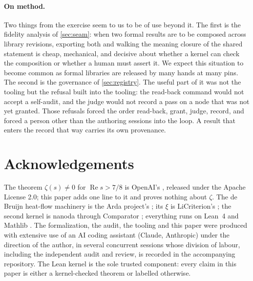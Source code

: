 \documentclass[11pt]{article}
\theoremstyle{definition}
\newcommand{\re}{\operatorname{Re}}
\begin{document}
\paragraph{On method.} Two things from the exercise seem to us to be of use beyond it. The first is the fidelity analysis of \cref{sec:seam}: when two formal results are to be composed across library revisions, exporting both and walking the meaning closure of the shared statement is cheap, mechanical, and decisive about whether a kernel can check the composition or whether a human must assert it. We expect this situation to become common as formal libraries are released by many hands at many pins. The second is the governance of \cref{sec:registry}. The useful part of it was not the tooling but the refusal built into the tooling: the read-back command would not accept a self-audit, and the judge would not record a pass on a node that was not yet granted. Those refusals forced the order read-back, grant, judge, record, and forced a person other than the authoring sessions into the loop. A result that enters the record that way carries its own provenance.

\section*{Acknowledgements}

The theorem $\zeta(s) \ne 0$ for $\re s > 7/8$ is OpenAI's \cite{OAIqrh,OAImath}, released under the Apache License 2.0; this paper adds one line to it and proves nothing about $\zeta$. The de Bruijn heat-flow machinery is the Arda project's \cite{Arda}; its $\xi$ is LiCriterion's \cite{LiCrit}; the second kernel is nanoda \cite{nanoda} through Comparator \cite{Comparator}; everything runs on Lean~4 and Mathlib \cite{Lean,Mathlib}. The formalization, the audit, the tooling and this paper were produced with extensive use of an AI coding assistant (Claude, Anthropic) under the direction of the author, in several concurrent sessions whose division of labour, including the independent audit and review, is recorded in the accompanying repository. The Lean kernel is the sole trusted component: every claim in this paper is either a kernel-checked theorem or labelled otherwise.
\end{document}
